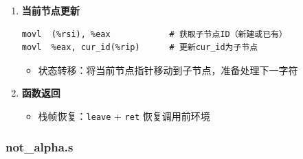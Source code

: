 \documentclass[10pt,a4paper]{article}
\begin{document}
\begin{enumerate}
    \item \textbf{当前节点更新}
    \begin{lstlisting}[language={[x86masm]Assembler}]
movl  (%rsi), %eax            # 获取子节点ID（新建或已有）
movl  %eax, cur_id(%rip)      # 更新cur_id为子节点
    \end{lstlisting}
    \begin{itemize}
        \item 状态转移：将当前节点指针移动到子节点，准备处理下一字符
    \end{itemize}
    
    \item \textbf{函数返回}
    \begin{itemize}
        \item 栈帧恢复：\verb|leave| + \verb|ret| 恢复调用前环境
    \end{itemize}
\end{enumerate}

\subsubsection{not\_alpha.s}
\end{document}
